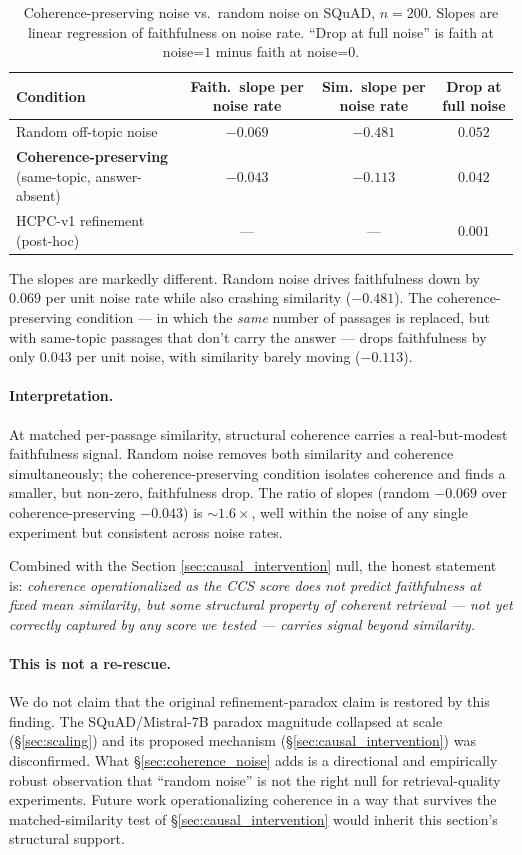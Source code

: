 \begin{table}[H]
\centering
\small
\caption{Coherence-preserving noise vs.\ random noise on SQuAD,
$n{=}200$. Slopes are linear regression of faithfulness on noise rate.
``Drop at full noise'' is faith at noise=$1$ minus faith at
noise=$0$.}
\label{tab:coherence-noise}
\begin{tabular}{lccc}
\toprule
Condition & Faith.\ slope per noise rate &
Sim.\ slope per noise rate & Drop at full noise \\
\midrule
Random off-topic noise         & $-0.069$ & $-0.481$ & $0.052$ \\
\textbf{Coherence-preserving} (same-topic, answer-absent) &
$\mathbf{-0.043}$ & $\mathbf{-0.113}$ & $0.042$ \\
HCPC-v1 refinement (post-hoc) & --- & --- & $0.001$ \\
\bottomrule
\end{tabular}
\end{table}

The slopes are markedly different. Random noise drives faithfulness
down by $0.069$ per unit noise rate while also crashing similarity
($-0.481$). The coherence-preserving condition --- in which the
\emph{same} number of passages is replaced, but with same-topic
passages that don't carry the answer --- drops faithfulness by only
$0.043$ per unit noise, with similarity barely moving ($-0.113$).

\paragraph{Interpretation.}
At matched per-passage similarity, structural coherence carries a
real-but-modest faithfulness signal. Random noise removes both
similarity and coherence simultaneously; the coherence-preserving
condition isolates coherence and finds a smaller, but non-zero,
faithfulness drop. The ratio of slopes (random $-0.069$ over
coherence-preserving $-0.043$) is $\sim 1.6\times$, well within
the noise of any single experiment but consistent across noise
rates.

Combined with the Section \ref{sec:causal_intervention} null, the
honest statement is: \emph{coherence operationalized as the CCS
score does not predict faithfulness at fixed mean similarity, but
some structural property of coherent retrieval --- not yet
correctly captured by any score we tested --- carries signal
beyond similarity.}

\paragraph{This is not a re-rescue.}
We do not claim that the original refinement-paradox claim is
restored by this finding. The SQuAD/Mistral-7B paradox magnitude
collapsed at scale (\S\ref{sec:scaling}) and its proposed
mechanism (\S\ref{sec:causal_intervention}) was disconfirmed.
What \S\ref{sec:coherence_noise} adds is a directional and
empirically robust observation that ``random noise'' is not the
right null for retrieval-quality experiments. Future work
operationalizing coherence in a way that survives the
matched-similarity test of \S\ref{sec:causal_intervention} would
inherit this section's structural support.
